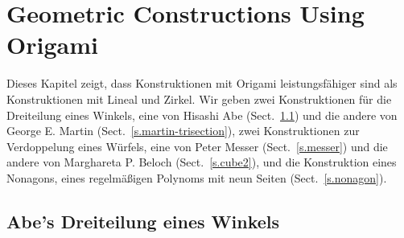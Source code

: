 
\chapter{Geometric Constructions Using Origami}\label{c.origami-constructions}


Dieses Kapitel zeigt, dass Konstruktionen mit Origami leistungsfähiger sind als Konstruktionen mit Lineal und Zirkel. Wir geben zwei Konstruktionen für die Dreiteilung eines Winkels, eine von Hisashi Abe (Sect.~\ref{s.abe-trisection}) und die andere von George E. Martin (Sect.~\ref{s.martin-trisection}), zwei Konstruktionen zur Verdoppelung eines Würfels, eine von Peter Messer (Sect.~\ref{s.messer}) und die andere von Marghareta P. Beloch (Sect.~\ref{s.cube2}), und die Konstruktion eines Nonagons, eines regelmäßigen Polynoms mit neun Seiten (Sect.~\ref{s.nonagon}).

\section{Abe's Dreiteilung eines Winkels}\label{s.abe-trisection}

